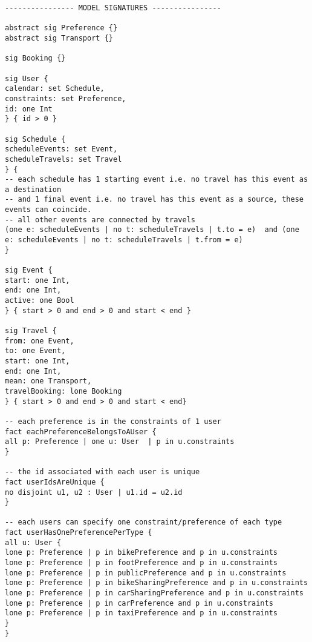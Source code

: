 \begin{lstlisting}[language=alloy]
---------------- MODEL SIGNATURES ----------------

abstract sig Preference {}
abstract sig Transport {}

sig Booking {}

sig User {
calendar: set Schedule,
constraints: set Preference,
id: one Int
} { id > 0 }

sig Schedule {
scheduleEvents: set Event,
scheduleTravels: set Travel
} { 
-- each schedule has 1 starting event i.e. no travel has this event as a destination
-- and 1 final event i.e. no travel has this event as a source, these events can coincide.
-- all other events are connected by travels
(one e: scheduleEvents | no t: scheduleTravels | t.to = e)	and (one e: scheduleEvents | no t: scheduleTravels | t.from = e)
}

sig Event {
start: one Int,
end: one Int,
active: one Bool
} { start > 0 and end > 0 and start < end }

sig Travel {
from: one Event,
to: one Event,
start: one Int,
end: one Int,
mean: one Transport,
travelBooking: lone Booking
} { start > 0 and end > 0 and start < end}

-- each preference is in the constraints of 1 user
fact eachPreferenceBelongsToAUser {
all p: Preference | one u: User  | p in u.constraints
}

-- the id associated with each user is unique
fact userIdsAreUnique {
no disjoint u1, u2 : User | u1.id = u2.id
}

-- each users can specify one constraint/preference of each type
fact userHasOnePreferencePerType {
all u: User {
lone p: Preference | p in bikePreference and p in u.constraints
lone p: Preference | p in footPreference and p in u.constraints
lone p: Preference | p in publicPreference and p in u.constraints
lone p: Preference | p in bikeSharingPreference and p in u.constraints
lone p: Preference | p in carSharingPreference and p in u.constraints
lone p: Preference | p in carPreference and p in u.constraints
lone p: Preference | p in taxiPreference and p in u.constraints
}
}


\end{lstlisting}
